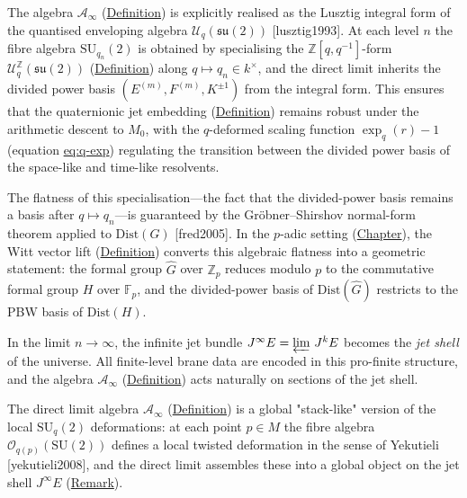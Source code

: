 \begin{remark}
  \label{rem:direct-limit-lusztig}
The algebra $\mathcal{A}_\infty$
(\hyperref[def:direct-limit-algebra]{Definition}) is explicitly realised as the
Lusztig integral form of the quantised enveloping algebra
$\mathcal{U}_q(\mathfrak{su}(2))$ [lusztig1993].  At each level $n$
the fibre algebra $\mathrm{SU}_{q_n}(2)$ is obtained by specialising the
$\mathbb{Z}[q,q^{-1}]$-form
$\mathcal{U}^{\mathbb{Z}}_q(\mathfrak{su}(2))$
(\hyperref[def:substrate-parameter]{Definition}) along
$q \mapsto q_n \in k^{\times}$, and the direct limit inherits the divided
power basis $(E^{(m)}, F^{(m)}, K^{\pm 1})$ from the integral form.  This
ensures that the quaternionic jet embedding
(\hyperref[def:quaternionic-spectral-resolvents]{Definition}) remains robust
under the arithmetic descent to $M_0$, with the $q$-deformed scaling
function $\exp_q(r) - 1$ (equation \hyperref[eq:q-exp]{eq:q-exp}) regulating the
transition between the divided power basis of the space-like and time-like
resolvents.

The flatness of this specialisation---the fact that the divided-power
basis remains a basis after $q \mapsto q_n$---is guaranteed by the
Gröbner--Shirshov normal-form theorem applied to
$\mathrm{Dist}(G)$ [fred2005].  In the $p$-adic setting
(\hyperref[chap:p-adic]{Chapter}), the Witt vector lift
(\hyperref[def:witt-vector-lift]{Definition}) converts this algebraic
flatness into a geometric statement: the formal group $\widehat{G}$
over $\mathbb{Z}_p$ reduces modulo $p$ to the commutative
formal group $H$ over $\mathbb{F}_p$, and the divided-power basis
of $\mathrm{Dist}(\widehat{G})$ restricts to the PBW basis of
$\mathrm{Dist}(H)$.
\end{remark}

\begin{remark}
  \label{rem:jet-shell}
In the limit $n \to \infty$, the infinite jet bundle
$J^\infty E = \varprojlim\, J^k E$ becomes the \emph{jet shell} of the
universe.  All finite-level brane data are encoded in this pro-finite
structure, and the algebra $\mathcal{A}_\infty$
(\hyperref[def:direct-limit-algebra]{Definition}) acts naturally on sections of the
jet shell.
\end{remark}

\begin{remark}
  \label{rem:stack-like-structure}
The direct limit algebra $\mathcal{A}_\infty$
(\hyperref[def:direct-limit-algebra]{Definition}) is a global "stack-like"
version of the local $\mathrm{SU}_q(2)$ deformations: at each point
$p \in M$ the fibre algebra $\mathcal{O}_{q(p)}(\mathrm{SU}(2))$
defines a local twisted deformation in the sense of
Yekutieli [yekutieli2008], and the direct limit assembles these
into a global object on the jet shell $J^\infty E$
(\hyperref[rem:jet-shell]{Remark}).
\end{remark}

